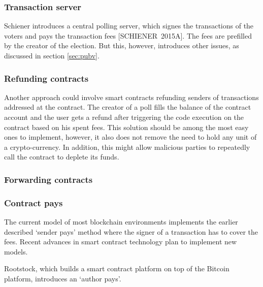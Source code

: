 \documentclass[9pt,oneside]{amsart}
\begin{document}
\begin{multicols}{2}
\subsubsection{Transaction server}
Schiener introduces a central polling server, which signes the transactions of the voters and pays the transaction fees [SCHIENER~2015A]. The fees are prefilled by the creator of the election. But this, however, introduces other issues, as discussed in section \ref{sec:pubv}.
\subsubsection{Refunding contracts}
Another approach could involve smart contracts refunding senders of transactions addressed at the contract. The creator of a poll fills the balance of the contract account and the user gets a refund after triggering the code execution on the contract based on his spent fees. This solution should be among the most easy ones to implement, however, it also does not remove the need to hold any unit of a crypto-currency. In addition, this might allow malicious parties to repeatedly call the contract to deplete its funds. %
\subsubsection{Forwarding contracts}


\subsubsection{Contract pays}
The current model of most blockchain environments implements the earlier described \enquote*{sender pays} method where the signer of a transaction has to cover the fees. Recent advances in smart contract technology plan to implement new models.\par
Rootstock, which builds a smart contract platform on top of the Bitcoin platform, introduces an \enquote*{author pays}.


\end{multicols}
\end{document}
